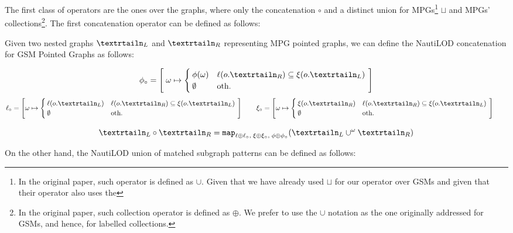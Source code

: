 The first class of operators are the ones over the graphs, where only the concatenation $\circ$ and a distinct union for MPGs\footnote{In the original paper, such operator is defined as $\cup$. Given that we have already used $\sqcup$ for our operator over GSMs and given that their operator also uses the } $\sqcup$ and MPGs' collections\footnote{In the original paper, such collection operator is defined as $\oplus$. We prefer to use the $\cup$ notation as the one originally addressed for GSMs, and hence, for labelled collections.}.  The first concatenation operator can be defined as follows:

\begin{definition}
Given two nested graphs $\nested_L$ and $\nested_R$ representing MPG pointed graphs, we can define the NautiLOD  concatenation for GSM  Pointed Graphs as follows:

\[\phi_{\circ} = \left[\;\omega\mapsto \begin{cases}
\phi(\omega) & \ell(o.\nested_R)\subseteq\xi(o.\nested_L)\\
\emptyset & \textup{oth.}\\
\end{cases}\;\right]\]
\[\ell_\circ = \left[\omega\mapsto\begin{cases}
\ell(o.\nested_L) & \ell(o.\nested_R)\subseteq\xi(o.\nested_L) \\
\emptyset & \textup{oth.} \\
\end{cases}\;\right]\qquad \xi_\circ = \left[\omega\mapsto\begin{cases}
\xi(o.\nested_R) & \ell(o.\nested_R)\subseteq\xi(o.\nested_L) \\
\emptyset & \textup{oth.} \\
\end{cases}\;\right]\qquad\]


\[\nested_L \circ \nested_R = \texttt{map}_{\ell\oplus \ell_\circ,\;\xi\oplus \xi_\circ,\;\phi\oplus \phi_\circ}(\nested_L \cup^\omega \nested_R)\] 
\end{definition}

On the other hand, the NautiLOD union of matched subgraph patterns can be defined as follows:


